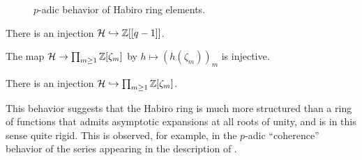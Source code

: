 \begin{figure}[H]

\caption{$p$-adic behavior of Habiro ring elements.}
\end{figure}
\begin{corollary}\label{corr: injection to power series in q minus 1}
    There is an injection $\mathcal{H}\hookrightarrow\mathbb{Z}[[q-1]]$. 
\end{corollary}
\begin{corollary}\label{corr: injection to product of adjointing roots of unity}
    The map $\mathcal{H}\to\prod_{m\geq 1}\mathbb{Z}[\zeta_{m}]$ by $h\mapsto (h(\zeta_{m}))_{m}$ is injective. 
\end{corollary}
\begin{corollary}
    There is an injection $\mathcal{H}\hookrightarrow\prod_{m\geq 1}\mathbb{Z}[\zeta_{m}]$. 
\end{corollary}
This behavior suggests that the Habiro ring is much more structured than a ring of functions that admits asymptotic expansions at all roots of unity, and is in this sense quite rigid. This is observed, for example, in the $p$-adic ``coherence'' behavior of the series appearing in the description of .

